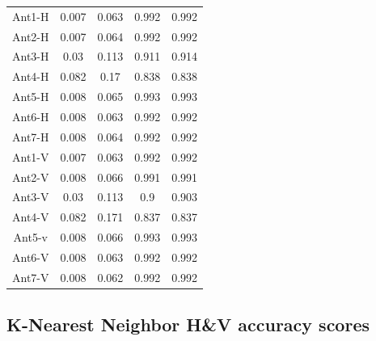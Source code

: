 \begin{table}[H]
\begin{center}
{\begin{tabular}{| c | c | c | c | c |}
Ant1-H&0.007 & 0.063 & 0.992    & 0.992     \\
Ant2-H&0.007 & 0.064 & 0.992    & 0.992     \\
Ant3-H&0.03  & 0.113 & 0.911    & 0.914     \\
Ant4-H&0.082 & 0.17  & 0.838    & 0.838     \\
Ant5-H&0.008 & 0.065 & 0.993    & 0.993     \\
Ant6-H&0.008 & 0.063 & 0.992    & 0.992     \\
Ant7-H&0.008 & 0.064 & 0.992    & 0.992     \\
Ant1-V&0.007 & 0.063 & 0.992    & 0.992     \\
Ant2-V&0.008 & 0.066 & 0.991    & 0.991     \\
Ant3-V&0.03  & 0.113 & 0.9      & 0.903     \\
Ant4-V&0.082 & 0.171 & 0.837    & 0.837     \\
Ant5-v&0.008 & 0.066 & 0.993    & 0.993     \\
Ant6-V&0.008 & 0.063 & 0.992    & 0.992     \\
Ant7-V&0.008 & 0.062 & 0.992    & 0.992     \\ 
 \hline
\end{tabular}}
\end{center}
\end{table}

\subsection{K-Nearest Neighbor H\&V accuracy scores}

